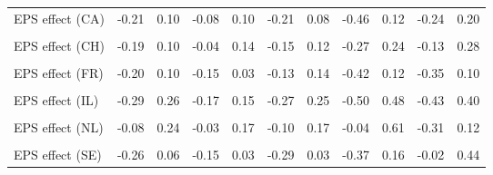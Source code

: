 \begin{table}
\begin{tabular}[t]{lrrrrrrrrrr}
EPS effect (CA) & -0.21 & 0.10 & -0.08 & 0.10 & -0.21 & 0.08 & -0.46 & 0.12 & -0.24 & 0.20\\
\cellcolor{gray!10}{Intercept (CH)} & \cellcolor{gray!10}{-0.50} & \cellcolor{gray!10}{0.38} & \cellcolor{gray!10}{-0.21} & \cellcolor{gray!10}{0.33} & \cellcolor{gray!10}{-0.42} & \cellcolor{gray!10}{0.37} & \cellcolor{gray!10}{-0.75} & \cellcolor{gray!10}{0.79} & \cellcolor{gray!10}{-0.53} & \cellcolor{gray!10}{0.74}\\
EPS effect (CH) & -0.19 & 0.10 & -0.04 & 0.14 & -0.15 & 0.12 & -0.27 & 0.24 & -0.13 & 0.28\\
\cellcolor{gray!10}{Intercept (FR)} & \cellcolor{gray!10}{-0.54} & \cellcolor{gray!10}{0.41} & \cellcolor{gray!10}{-0.31} & \cellcolor{gray!10}{0.20} & \cellcolor{gray!10}{-0.39} & \cellcolor{gray!10}{0.40} & \cellcolor{gray!10}{-0.98} & \cellcolor{gray!10}{0.64} & \cellcolor{gray!10}{-0.82} & \cellcolor{gray!10}{0.51}\\
EPS effect (FR) & -0.20 & 0.10 & -0.15 & 0.03 & -0.13 & 0.14 & -0.42 & 0.12 & -0.35 & 0.10\\
\cellcolor{gray!10}{Intercept (IL)} & \cellcolor{gray!10}{-0.56} & \cellcolor{gray!10}{0.43} & \cellcolor{gray!10}{-0.27} & \cellcolor{gray!10}{0.28} & \cellcolor{gray!10}{-0.46} & \cellcolor{gray!10}{0.40} & \cellcolor{gray!10}{-0.99} & \cellcolor{gray!10}{0.70} & \cellcolor{gray!10}{-0.76} & \cellcolor{gray!10}{0.65}\\
EPS effect (IL) & -0.29 & 0.26 & -0.17 & 0.15 & -0.27 & 0.25 & -0.50 & 0.48 & -0.43 & 0.40\\
\cellcolor{gray!10}{Intercept (NL)} & \cellcolor{gray!10}{-0.31} & \cellcolor{gray!10}{0.58} & \cellcolor{gray!10}{-0.19} & \cellcolor{gray!10}{0.37} & \cellcolor{gray!10}{-0.31} & \cellcolor{gray!10}{0.42} & \cellcolor{gray!10}{-0.51} & \cellcolor{gray!10}{1.40} & \cellcolor{gray!10}{-0.72} & \cellcolor{gray!10}{0.43}\\
EPS effect (NL) & -0.08 & 0.24 & -0.03 & 0.17 & -0.10 & 0.17 & -0.04 & 0.61 & -0.31 & 0.12\\
\cellcolor{gray!10}{Intercept (SE)} & \cellcolor{gray!10}{-0.62} & \cellcolor{gray!10}{0.34} & \cellcolor{gray!10}{-0.32} & \cellcolor{gray!10}{0.20} & \cellcolor{gray!10}{-0.68} & \cellcolor{gray!10}{0.28} & \cellcolor{gray!10}{-0.86} & \cellcolor{gray!10}{0.63} & \cellcolor{gray!10}{-0.39} & \cellcolor{gray!10}{1.09}\\
EPS effect (SE) & -0.26 & 0.06 & -0.15 & 0.03 & -0.29 & 0.03 & -0.37 & 0.16 & -0.02 & 0.44\\

\end{tabular}
\end{table}
